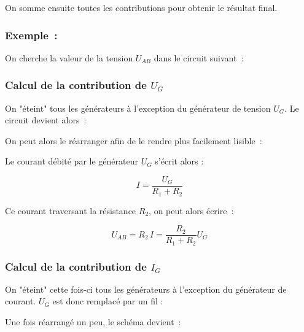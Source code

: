 On somme ensuite toutes les contributions pour obtenir le résultat final.

\pagebreak
\subsubsection*{Exemple~:}

On cherche la valeur de la tension $U_{AB}$ dans le circuit suivant~:

\begin{center}
	
\end{center}


\subsubsection*{Calcul de la contribution de $U_G$}


On "éteint" tous les générateurs à l'exception du générateur de tension $U_G$. Le circuit devient alors~:

\begin{center}
	
\end{center}

On peut alors le réarranger afin de le rendre plus facilement lisible~:

\begin{center}
	
\end{center}

Le courant débité par le générateur $U_G$ s'écrit alors :

$$ I = \dfrac{U_G}{R_1 + R_2} $$

Ce courant traversant la résistance $R_2$, on peut alors écrire~:

$$ U_{AB} = R_2 \, I = \dfrac{R_2}{R_1 + R_2} U_G $$

\subsubsection*{Calcul de la contribution de $I_G$}

On "éteint" cette fois-ci tous les générateurs à l'exception du générateur de courant. $U_G$ est donc remplacé par un fil :

\begin{center}
	
\end{center}

Une fois réarrangé un peu, le schéma devient~:

